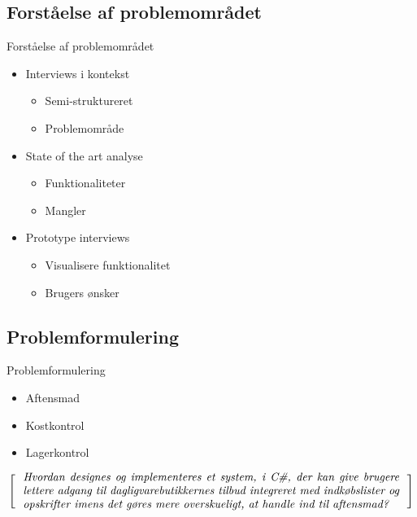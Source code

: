 \subsection{Forståelse af problemområdet}
\begin{frame}[t]{Forståelse af problemområdet}
\begin{itemize}
   \item<1> Interviews i kontekst
   \begin{itemize}
      \item<1> Semi-struktureret
      \item<1> Problemområde
   \end{itemize}
   \item<2> State of the art analyse
   \begin{itemize}
      \item<2> Funktionaliteter
      \item<2> Mangler
   \end{itemize}
   \item<3> Prototype interviews
   \begin{itemize}
      \item<3> Visualisere funktionalitet
      \item<3> Brugers ønsker
   \end{itemize}
\end{itemize}
\end{frame}

\subsection{Problemformulering}
\begin{frame}[t]{Problemformulering}
   \begin{itemize}
      \item Aftensmad
      \item Kostkontrol
      \item Lagerkontrol
   \end{itemize}
\[
  \left[
  \begin{minipage}{\textwidth}
  \centering
  \begin{minipage}{0.96\textwidth}
  \textit{Hvordan designes og implementeres et system, i C\#, der kan give brugere lettere adgang til dagligvarebutikkernes tilbud integreret med indkøbslister og opskrifter imens det gøres mere overskueligt, at handle ind til aftensmad?}
  \end{minipage} 
  \end{minipage}                           
    \right]
\]
\end{frame}